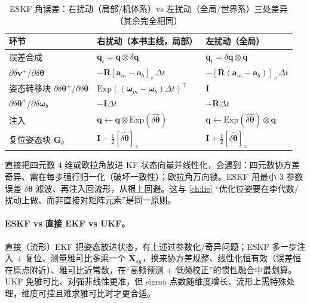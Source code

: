 \begin{table}[H]\centering\small
\caption{ESKF 角误差：右扰动（局部/机体系）vs 左扰动（全局/世界系）三处差异（其余完全相同）}
\label{tab:eskf-pert}
\begin{tabular}{lll}
\toprule
环节 & 右扰动（本书主线，局部） & 左扰动（全局） \\
\midrule
误差合成 & $\mathbf{q}_t=\mathbf{q}\otimes\delta\mathbf{q}$ & $\mathbf{q}_t=\delta\mathbf{q}\otimes\mathbf{q}$ \\
$\partial\delta\mathbf{v}^+/\partial\delta\boldsymbol{\theta}$ & $-\mathbf{R}[\mathbf{a}_m-\mathbf{a}_b]_\times\Delta t$ & $-[\mathbf{R}(\mathbf{a}_m-\mathbf{a}_b)]_\times\Delta t$ \\
姿态转移块 $\partial\delta\boldsymbol{\theta}^+/\partial\delta\boldsymbol{\theta}$ & $\mathrm{Exp}((\boldsymbol{\omega}_m-\boldsymbol{\omega}_b)\Delta t)^\top$ & $\mathbf{I}$ \\
$\partial\delta\boldsymbol{\theta}^+/\partial\delta\boldsymbol{\omega}_b$ & $-\mathbf{I}\Delta t$ & $-\mathbf{R}\Delta t$ \\
注入 & $\mathbf{q}\leftarrow\mathbf{q}\otimes\mathrm{Exp}(\widehat{\delta\boldsymbol{\theta}})$ & $\mathbf{q}\leftarrow\mathrm{Exp}(\widehat{\delta\boldsymbol{\theta}})\otimes\mathbf{q}$ \\
复位姿态块 $\mathbf{G}_{\theta}$ & $\mathbf{I}-\tfrac12[\widehat{\delta\boldsymbol{\theta}}]_\times$ & $\mathbf{I}+\tfrac12[\widehat{\delta\boldsymbol{\theta}}]_\times$ \\
\bottomrule
\end{tabular}
\end{table}

\begin{pitfall}
直接把四元数 $4$ 维或欧拉角放进 KF 状态向量并线性化，会遇到：四元数协方差奇异、需在每步强行归一化（破坏一致性）；欧拉角万向锁。ESKF 用最小 $3$ 参数误差 $\delta\boldsymbol{\theta}$ 滤波、再注入回流形，从根上回避。这与 \cref{ch:lie} “优化位姿要在李代数/扰动上做、而非直接对矩阵元素”是同一原则。
\end{pitfall}

\paragraph{ESKF vs 直接 EKF vs UKF。}
直接（流形）EKF 把姿态放进状态，有上述过参数化/奇异问题；ESKF 多一步注入 $+$ 复位、测量雅可比多乘一个 $\mathbf{X}_{\delta\mathbf{x}}$，换来协方差规整、线性化恒有效（误差恒在原点附近）、雅可比近常数，在“高频预测 $+$ 低频校正”的惯性融合中最划算。UKF 免雅可比、对强非线性更准，但 sigma 点数随维度增长、流形上需特殊处理，维度可控且难求雅可比时才更合适。

